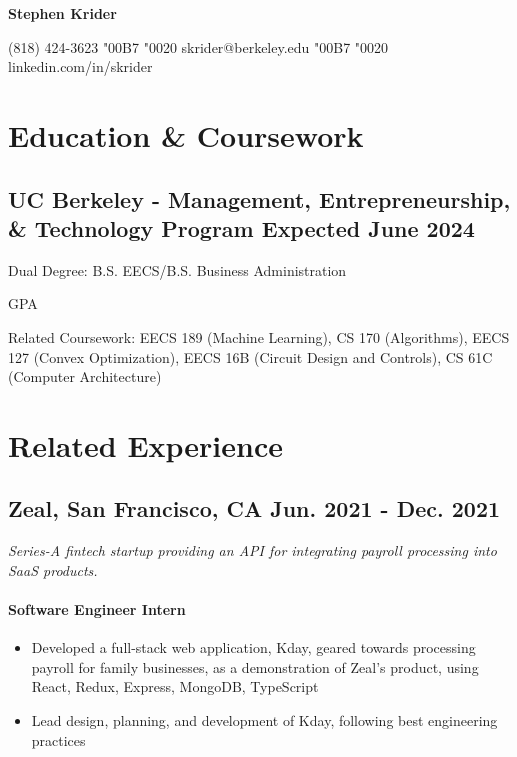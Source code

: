 \documentclass{article}
\begin{document}
	\begin{center}
		{\namefont \fontsize{18}{24}\selectfont \textbf{Stephen Krider}}

		\vspace{0.075in}
		
		(818) 424-3623
		\char"00B7 
		\char"0020
		skrider@berkeley.edu 
		\char"00B7 
		\char"0020
		linkedin.com/in/skrider
	\end{center}
	\vspace{-17pt}
	\section{Education \& Coursework}
	\subsection{
		{\bfseries UC Berkeley - Management, Entrepreneurship, \& Technology Program}
		{\hspace{\fill}\bfseries Expected June 2024}
	}
	Dual Degree: B.S. EECS/B.S. Business Administration

	 GPA

	\noindent Related Coursework: EECS 189 (Machine Learning), CS 170 (Algorithms), EECS 127 (Convex Optimization), EECS 16B (Circuit Design and Controls), CS 61C (Computer Architecture) 
	
	\section{Related Experience}

	\subsection{
		\textbf{Zeal}, San Francisco, CA 
		{\hspace{\fill}\bfseries Jun. 2021 - Dec. 2021}
	}
	{\itshape Series-A fintech startup providing an API for integrating payroll processing into SaaS products.}
	\paragraph{Software Engineer Intern}
	\begin{itemize}
		\item Developed a full-stack web application, Kday, geared towards processing payroll for family businesses, as a demonstration of Zeal’s product, using React, Redux, Express, MongoDB, TypeScript
		\item Lead design, planning, and development of Kday, following best engineering practices
	\end{itemize}
\end{document}
